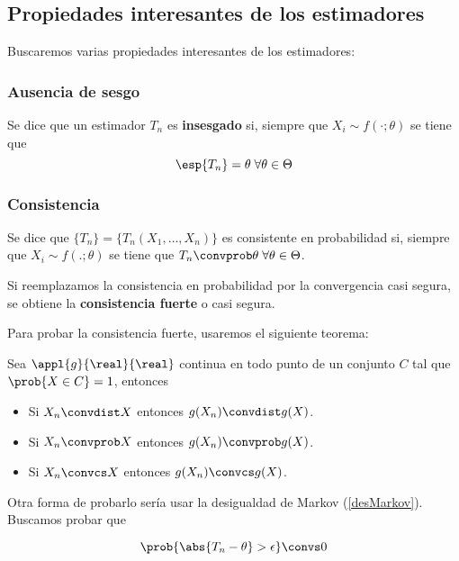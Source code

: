 \documentclass{apuntes}
\begin{document}
\subsection{Propiedades interesantes de los estimadores}
Buscaremos varias propiedades interesantes de los estimadores:

\subsubsection{Ausencia de sesgo} Se dice que un estimador $T_n$ es \textbf{insesgado}  si, siempre que $X_i \sim f(\cdot;\theta)$ se tiene que \[\esp{T_n} = \theta\; \forall \theta \in \Theta \]

\subsubsection{Consistencia} Se dice que $\{T_n\} = \{ T_n(X_1, \dotsc, X_n) \}$ es consistente en probabilidad si, siempre que $X_i \sim f(.;\theta)$ se tiene que $T_n \convprob \theta \; \forall \theta \in \Theta$.

Si reemplazamos la consistencia en probabilidad por la convergencia casi segura, se obtiene la \textbf{consistencia fuerte} o casi segura. 

Para probar la consistencia fuerte, usaremos el siguiente teorema:

\begin{theorem} \label{thmApContinua} Sea $\appl{g}{\real}{\real}$ continua en todo punto de un conjunto $C$ tal que $\prob{X\in C} = 1$, entonces

\begin{itemize}
\item Si $X_n\convdist X$ entonces $g(X_n)\convdist  g(X)$.
\item Si $X_n\convprob X$ entonces $g(X_n)\convprob g(X)$.
\item Si $X_n\convcs X$ entonces $g(X_n)\convcs g(X)$.
\end{itemize}

\end{theorem}
 
Otra forma de probarlo sería usar la desigualdad de Markov (\ref{desMarkov}). Buscamos probar que 

\[ \prob{\abs{T_n - \theta} > \epsilon} \convs 0 \]
\end{document}
